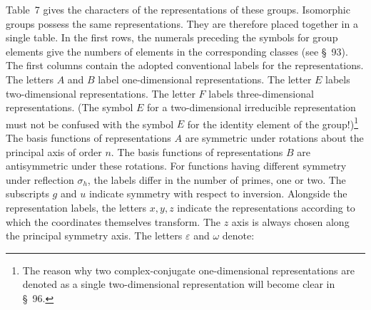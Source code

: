 Table~7 gives the characters of the representations of these groups. Isomorphic groups possess the same representations. They are therefore placed together in a single table. In the first rows, the numerals preceding the symbols for group elements give the numbers of elements in the corresponding classes (see \S~93). The first columns contain the adopted conventional labels for the representations. The letters $A$ and $B$ label one-dimensional representations. The letter $E$ labels two-dimensional representations. The letter $F$ labels three-dimensional representations. (The symbol $E$ for a two-dimensional irreducible representation must not be confused with the symbol $E$ for the identity element of the group!)\footnote{The reason why two complex-conjugate one-dimensional representations are denoted as a single two-dimensional representation will become clear in \S~96.} The basis functions of representations $A$ are symmetric under rotations about the principal axis of order $n$. The basis functions of representations $B$ are antisymmetric under these rotations. For functions having different symmetry under reflection $\sigma_h$, the labels differ in the number of primes, one or two. The subscripts $g$ and $u$ indicate symmetry with respect to inversion. Alongside the representation labels, the letters $x,y,z$ indicate the representations according to which the coordinates themselves transform. The $z$ axis is always chosen along the principal symmetry axis. The letters $\varepsilon$ and $\omega$ denote:
